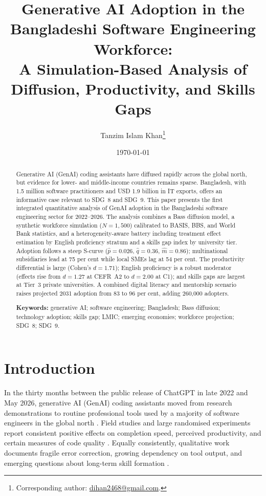 \documentclass[11pt,a4paper]{article}
\title{\bfseries Generative AI Adoption in the Bangladeshi Software
       Engineering Workforce:\\
       A Simulation-Based Analysis of Diffusion, Productivity, and
       Skills Gaps}
\author[1]{Tanzim Islam Khan\thanks{Corresponding author:
       \href{mailto:dihan2468@gmail.com}{dihan2468@gmail.com}.}}
\affil[1]{Independent Researcher}
\date{\today}
\begin{document}

\maketitle

\begin{abstract}
\noindent
Generative AI (GenAI) coding assistants have diffused rapidly across
the global north, but evidence for lower- and middle-income countries
remains sparse. Bangladesh, with 1.5 million software practitioners
and USD 1.9 billion in IT exports, offers an informative case
relevant to SDG~8 and SDG~9. This paper presents the first integrated
quantitative analysis of GenAI adoption in the Bangladeshi software
engineering sector for 2022--2026. The analysis combines a Bass
diffusion model, a synthetic workforce simulation ($N=1{,}500$)
calibrated to BASIS, BBS, and World Bank statistics, and a
heterogeneity-aware battery including treatment effect estimation by
English proficiency stratum and a skills gap index by university
tier. Adoption follows a steep S-curve ($\hat{p}=0.026$,
$\hat{q}=0.36$, $\hat{m}=0.86$); multinational subsidiaries lead at
75 per cent while local SMEs lag at 54 per cent. The productivity
differential is large (Cohen's $d=1.71$); English proficiency is a
robust moderator (effects rise from $d=1.27$ at CEFR~A2 to $d=2.00$
at C1); and skills gaps are largest at Tier~3 private universities. A
combined digital literacy and mentorship scenario raises projected
2031 adoption from 83 to 96 per cent, adding 260{,}000 adopters.

\vspace{0.6em}
\noindent\textbf{Keywords:} generative AI; software engineering;
Bangladesh; Bass diffusion; technology adoption; skills gap; LMIC;
emerging economies; workforce projection; SDG~8; SDG~9.
\end{abstract}

\clearpage

\section{Introduction}

In the thirty months between the public release of ChatGPT in late
2022 and May 2026, generative AI (GenAI) coding assistants moved from
research demonstrations to routine professional tools used by a
majority of software engineers in the global north
\citep{StackOverflow2025,GitHubOctoverse2024}. Field studies and large
randomised experiments report consistent positive effects on
completion speed, perceived productivity, and certain measures of
code quality
\citep{PengKalliamvakouEtAl2023,NoyZhang2023,CuiDemirerEtAl2025,BrynjolfssonLiRaymond2025,ZieglerEtAl2024}.
Equally consistently, qualitative work documents fragile error
correction, growing dependency on tool output, and emerging questions
about long-term skill formation
\citep{Vaithilingam2022,BarkeJamesPolikarpova2023,LiangYangMyers2024,MozannarEtAl2024}.
\end{document}
